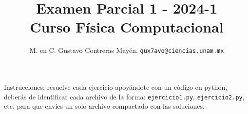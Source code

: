 
\usetikzlibrary{patterns}

\title{\vspace{-2cm} Examen Parcial 1 - 2024-1 \\ {\large Curso Física Computacional} \vspace{-3ex}}
\author{M. en C. Gustavo Contreras Mayén. \texttt{gux7avo@ciencias.unam.mx}}
\date{}



\fontsize{14}{14}\selectfont
\vspace{-4cm}
\maketitle

Instrucciones: resuelve cada ejercicio apoyándote con un código en python, deberás de identificar cada archivo de la forma: \texttt{ejercicio1.py}, \texttt{ejercicio2.py}, etc. para que envíes un solo archivo compactado con las soluciones. 
